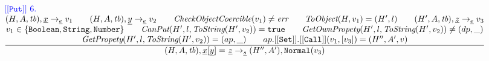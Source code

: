 \documentclass[a4paper, leqno]{amsart}
\newcommand{\rulesep}{\quad\quad}
\newcommand{\stmt}{s}
\newcommand{\expr}{e}
\newcommand{\ir}[1]{\ensuremath{\underline{#1}}}
\newcommand{\irid}{\ir{x}}
\def\inred{\color{red}}
\def\inblue{\color{blue}}
\newcommand{\strict}{{\inred\tt strict}}
\newcommand{\true}{{\tt true}}
\newcommand{\tb}{\emph{tb}}
\newcommand{\err}{\emph{err}}
\newcommand{\hf}[1]{\emph{#1}}
\newcommand{\state}{\ensuremath{(H,A,\tb)}}
\newcommand{\evale}{\ensuremath{(H,A,\tb)}}
\def\inred{\color{red}}
\def\inblue{\color{blue}}
\begin{document}
\[\begin{array}{l@{~~}l@{~~}ll}
{\inblue {\tt[[Put]]}\ 6.}\\
\frac{\begin{matrix}
\evale, \irid \rightarrow_{\ir\expr} v_1
\rulesep
\evale, \ir{y} \rightarrow_{\ir\expr} v_2
\rulesep
\hf{CheckObjectCoercible}(v_1) \not= \err
\rulesep
\hf{ToObject}(H, v_1) = (H',l)
\rulesep
(H', A, \tb), \ir{z} \rightarrow_{\ir\expr} v_3
\\
v_1 \in \{{\tt Boolean, String, Number}\}
\rulesep
\hf{CanPut}(H', l, \hf{ToString}(H', v_2)) = \true
\rulesep
\hf{GetOwnPropety}(H', l, \hf{ToString}(H', v_2)) \not= (dp, \_)
\\
\hf{GetPropety}(H', l, \hf{ToString}(H', v_2)) = (ap, \_)
\rulesep
ap.{\tt[[Set]]}.{\tt[[Call]]}(v_1, [v_3]) = (H'', A', v)
\end{matrix}}{\begin{matrix}
\state, \irid{\tt[}\ir{y}{\tt] =} \ \ir{z} \rightarrow_{\ir\stmt}
(H'',A'), {\tt Normal}(v_3)
\end{matrix}}
\\[2em]





\end{array}\]
\end{document}
